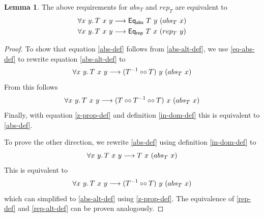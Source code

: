 \documentclass[]{article}
\theoremstyle{definition}
\newtheorem{lemma}[theorem]{Lemma}
\newcommand{\relcomp}{\mathbin{\circ\circ}}
\newcommand{\inv}{^{-1}}
\newcommand{\eqrep}{\mathsf{Eq_{rep}}}
\newcommand{\eqabs}{\mathsf{Eq_{abs}}}
\begin{document}
\begin{lemma}
	The above requirements for \(abs_T\) and \(rep_T\) are equivalent to
	\begin{align}
		\forall x\ y\ldotp T\ x\ y &\longrightarrow \eqabs\ T\ y\ (abs_T\ x) \label{abs-alt-def} \\
		\forall x\ y\ldotp T\ x\ y &\longrightarrow \eqrep\ T\ x\ (rep_T\ y) \label{rep-alt-def}
	\end{align}
\end{lemma}
\begin{proof}
	To show that equation \ref{abs-def} follows from \ref{abs-alt-def}, we use \ref{eq-abs-def} to rewrite equation \ref{abs-alt-def} to
	\begin{equation}
		\forall x\ y\ldotp T\ x\ y \longrightarrow (T\inv \relcomp T)\ y\ (abs_T\ x)
	\end{equation}
	From this follows
	\begin{equation}
		\forall x\ y\ldotp T\ x\ y \longrightarrow (T \relcomp T\inv \relcomp T)\ x\ (abs_T\ x)
	\end{equation}
	Finally, with equation \ref{z-prop-def} and definition \ref{in-dom-def} this is equivalent to \ref{abs-def}.
	
	To prove the other direction, we rewrite \ref{abs-def} using definition \ref{in-dom-def} to
	\begin{equation}
		\forall x\ y\ldotp T\ x\ y\longrightarrow T\ x\ (abs_T\ x)
	\end{equation}
	This is equivalent to
	\begin{equation}
		\forall x\ y\ldotp T\ x\ y \longrightarrow (T\inv \relcomp T)\ y\ (abs_T\ x)
	\end{equation}
	which can simplified to \ref{abs-alt-def} using \ref{z-prop-def}.
	The equivalence of \ref{rep-def} and \ref{rep-alt-def} can be proven analogously.
\end{proof}
\end{document}
